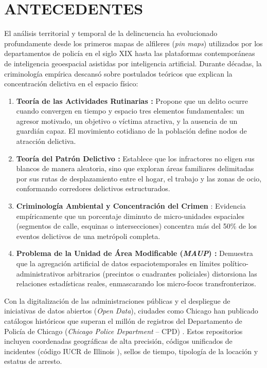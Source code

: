 \section{ANTECEDENTES}

El análisis territorial y temporal de la delincuencia ha evolucionado profundamente desde los primeros mapas de alfileres (\textit{pin maps}) utilizados por los departamentos de policía en el siglo XIX hasta las plataformas contemporáneas de inteligencia geoespacial asistidas por inteligencia artificial. Durante décadas, la criminología empírica descansó sobre postulados teóricos que explican la concentración delictiva en el espacio físico:

\begin{enumerate}
    \item \textbf{Teoría de las Actividades Rutinarias \cite{cohen1979}:} Propone que un delito ocurre cuando convergen en tiempo y espacio tres elementos fundamentales: un agresor motivado, un objetivo o víctima atractiva, y la ausencia de un guardián capaz. El movimiento cotidiano de la población define nodos de atracción delictiva.
    \item \textbf{Teoría del Patrón Delictivo \cite{brantingham1993}:} Establece que los infractores no eligen sus blancos de manera aleatoria, sino que exploran áreas familiares delimitadas por sus rutas de desplazamiento entre el hogar, el trabajo y las zonas de ocio, conformando corredores delictivos estructurados.
    \item \textbf{Criminología Ambiental y Concentración del Crimen} \citep{weisburd2015}: Evidencia empíricamente que un porcentaje diminuto de micro-unidades espaciales (segmentos de calle, esquinas o intersecciones) concentra más del 50\% de los eventos delictivos de una metrópoli completa.
    \item \textbf{Problema de la Unidad de Área Modificable (\textit{MAUP}) \cite{openshaw1984}:} Demuestra que la agregación artificial de datos espaciotemporales en límites político-administrativos arbitrarios (precintos o cuadrantes policiales) distorsiona las relaciones estadísticas reales, enmascarando los micro-focos transfronterizos.
\end{enumerate}

Con la digitalización de las administraciones públicas y el despliegue de iniciativas de datos abiertos (\textit{Open Data}), ciudades como Chicago han publicado catálogos históricos que superan el millón de registros del Departamento de Policía de Chicago (\textit{Chicago Police Department} -- CPD) \cite{cityofchicago2025}. Estos repositorios incluyen coordenadas geográficas de alta precisión, códigos unificados de incidentes (código IUCR de Illinois \cite{cpd2024}), sellos de tiempo, tipología de la locación y estatus de arresto. 


